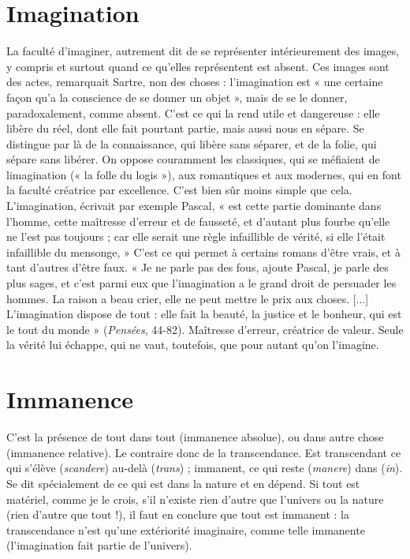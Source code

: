\section{Imagination}
La faculté d’imaginer, autrement dit de se représenter
intérieurement des images, y compris et surtout quand ce
qu’elles représentent est absent. Ces images sont des actes, remarquait Sartre,
non des choses : l’imagination est « une certaine façon qu’a la conscience de se
donner un objet », mais de se le donner, paradoxalement, comme absent. C’est
ce qui la rend utile et dangereuse : elle libère du réel, dont elle fait pourtant
partie, mais aussi nous en sépare. Se distingue par là de la connaissance, qui
libère sans séparer, et de la folie, qui sépare sans libérer.
On oppose couramment les classiques, qui se méfiaient de limagination
(« la folle du logis »), aux romantiques et aux modernes, qui en font la faculté
créatrice par excellence. C’est bien sûr moins simple que cela. L'imagination,
écrivait par exemple Pascal, « est cette partie dominante dans l’homme, cette
maîtresse d’erreur et de fausseté, et d’autant plus fourbe qu’elle ne l’est pas
toujours ; car elle serait une règle infaillible de vérité, si elle l'était infaillible du
mensonge, » C'est ce qui permet à certains romans d’être vrais, et à tant
d’autres d’être faux. « Je ne parle pas des fous, ajoute Pascal, je parle des plus
sages, et c’est parmi eux que l'imagination a le grand droit de persuader les
hommes. La raison a beau crier, elle ne peut mettre le prix aux choses. [...]
L’imagination dispose de tout : elle fait la beauté, la justice et le bonheur, qui
est le tout du monde » ({\it Pensées}, 44-82). Maîtresse d’erreur, créatrice de valeur.
Seule la vérité lui échappe, qui ne vaut, toutefois, que pour autant qu’on l’imagine.

\section{Immanence}
C'est la présence de tout dans tout (immanence absolue), ou
dans autre chose (immanence relative). Le contraire donc de
la transcendance. Est transcendant ce qui s'élève ({\it scandere}) au-delà ({\it trans}) ;
immanent, ce qui reste ({\it manere}) dans ({\it in}). Se dit spécialement de ce qui est
dans la nature et en dépend. Si tout est matériel, comme je le crois, s’il n'existe
rien d’autre que l'univers ou la nature (rien d’autre que tout !), il faut en
conclure que tout est immanent : la transcendance n’est qu’une extériorité imaginaire,
comme telle immanente (l'imagination fait partie de l’univers).

